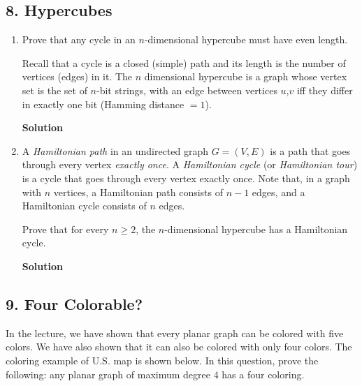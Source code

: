 \documentclass{article}
\begin{document}
\subsection*{8. Hypercubes}
\begin{enumerate}
\item Prove that any cycle in an $n$-dimensional hypercube must have even length.

\noindent Recall that a cycle is a closed (simple) path and its length is the number of vertices (edges) in it. The $n$ dimensional hypercube is a graph whose vertex set is the set of $n$-bit strings, with an edge between vertices $u$,$v$ iff they differ in exactly one bit (Hamming distance $=1$).
\begin{mdframed}
\textbf{Solution}

\end{mdframed}
\item A \textit{Hamiltonian path} in an undirected graph $G=(V,E)$ is a path that goes through every vertex \textit{exactly once}. A \textit{Hamiltonian cycle} (or \textit{Hamiltonian tour}) is a cycle that goes through every vertex exactly once. Note that, in a graph with $n$ vertices, a Hamiltonian path consists of $n-1$ edges, and a Hamiltonian cycle consists of $n$ edges.

\noindent Prove that for every $n\geqslant 2$, the $n$-dimensional hypercube has a Hamiltonian cycle.
\begin{mdframed}
\textbf{Solution}

\end{mdframed}
\end{enumerate}
\clearpage

\subsection*{9. Four Colorable?}
In the lecture, we have shown that every planar graph can be colored with five colors. We have also shown that it can also be colored with only four colors. The coloring example of U.S. map is shown below. In this question, prove the following: any planar graph of maximum degree $4$ has a four coloring.
\end{document}
